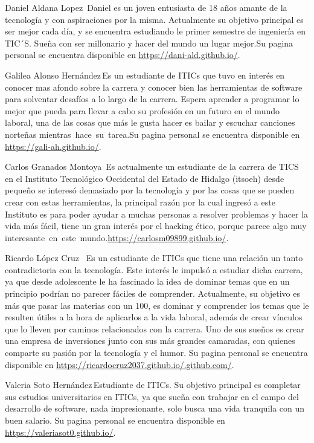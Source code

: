 \documentclass{IEEEcsmag}
\begin{document}
\begin{IEEEbiography}{Daniel Aldana Lopez}{\,}
Daniel es un joven entusiasta de 18 años amante de la tecnología y con aspiraciones por la misma. Actualmente su objetivo principal es ser mejor cada día, y se encuentra estudiando le primer semestre de ingeniería en TIC´S. Sueña con ser millonario y hacer del mundo un lugar mejor.Su pagina personal se encuentra disponible en \href{https://dani-ald.github.io/}{https://dani-ald.github.io/}.
\end{IEEEbiography}
\begin{IEEEbiography}{Galilea Alonso Hernández}{\,}Es un estudiante de ITICs que tuvo en interés en conocer mas afondo sobre la carrera y conocer bien las herramientas de software para solventar desafíos a lo largo de la carrera. Espera aprender a programar lo mejor que pueda para llevar a cabo su profesión en un futuro en el mundo laboral, una de las cosas que más le gusta hacer es bailar y escuchar canciones norteñas mientras hace su tarea.Su pagina personal se encuentra disponible en \href{https://gali-ah.github.io/}{https://gali-ah.github.io/}.
\end{IEEEbiography}
\begin{IEEEbiography}{Carlos Granados Montoya }{\,}Es actualmente un estudiante de la carrera de TICS en el Instituto Tecnológico Occidental del Estado de Hidalgo (itsoeh) desde pequeño se interesó demasiado por la tecnología y por las cosas que se pueden crear con estas herramientas, la principal razón por la cual ingresó a este Instituto es para poder ayudar a muchas personas a resolver problemas y hacer la vida más fácil, tiene un gran interés por el hacking ético, porque parece algo muy interesante en este mundo.\href{https://carlosm09899.github.io/}{https://carlosm09899.github.io/}.
\end{IEEEbiography}
\begin{IEEEbiography}{Ricardo López Cruz }{\,} Es un estudiante de ITICs que tiene una relación un tanto contradictoria con la tecnología. Este interés le impulsó a estudiar dicha carrera, ya que desde adolescente le ha fascinado la idea de dominar temas que en un principio podrían no parecer fáciles de comprender. Actualmente, su objetivo es más que pasar las materias con un 100, es dominar y comprender los temas que le resulten útiles a la hora de aplicarlos a la vida laboral, además de crear vínculos que lo lleven por caminos relacionados con la carrera. Uno de sus sueños es crear una empresa de inversiones junto con sus más grandes camaradas, con quienes comparte su pasión por la tecnología y el humor. Su pagina  personal se encuentra disponible en \href{https://ricardocruz2037.github.io/.github.com/}{https://ricardocruz2037.github.io/.github.com/}.\end{IEEEbiography}
\begin{IEEEbiography}{Valeria Soto Hernández}{\,}Estudiante de ITICs. Su objetivo principal  es completar sus estudios universitarios en ITICs, ya que sueña con trabajar en el campo del desarrollo de software, nada impresionante, solo busca una vida tranquila con un buen salario. Su pagina  personal se encuentra disponible en \href{https://valeriasot0.github.io/}{https://valeriasot0.github.io/}.
\end{IEEEbiography}
\end{document}
